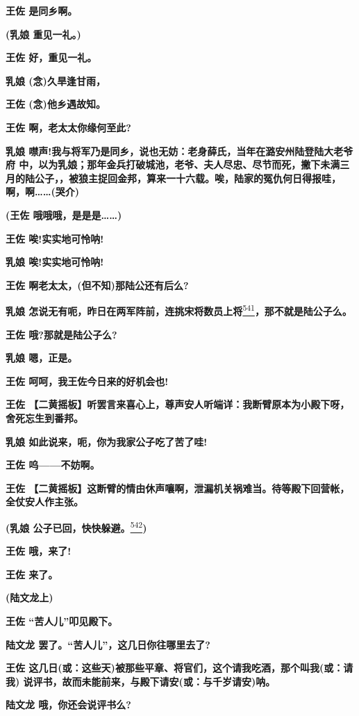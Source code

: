 \textbf{王佐 是同乡啊。}

\textbf{(乳娘 重见一礼。)}

\textbf{王佐 好，重见一礼。}

\textbf{乳娘 (念)久旱逢甘雨，}

\textbf{王佐 (念)他乡遇故知。}

\textbf{王佐 啊，老太太你缘何至此?}

\textbf{乳娘
噤声!我与将军乃是同乡，说也无妨：老身薛氏，当年在潞安州陆登陆大老爷府
中，以为乳娘；那年金兵打破城池，老爷、夫人尽忠、尽节而死，撇下未满三
月的陆公子，，被狼主捉回金邦，算来一十六载。唉，陆家的冤仇何日得报哇，
啊，啊\ldots{}\ldots{}(哭介)}

\textbf{(王佐 哦哦哦，是是是\ldots{}\ldots{})}

\textbf{王佐 唉!实实地可怜呐!}

\textbf{乳娘 唉!实实地可怜呐!}

\textbf{王佐 啊老太太，(但不知)那陆公还有后么?}

\textbf{乳娘
怎说无有呃，昨日在两军阵前，连挑宋将数员上将}\protect\hyperlink{fn541}{\textsuperscript{541}}\textbf{，那不就是陆公子么。}

\textbf{王佐 哦?那就是陆公子么?}

\textbf{乳娘 嗯，正是。}

\textbf{王佐 呵呵，我王佐今日来的好机会也!}

\textbf{王佐
【二黄摇板】听罢言来喜心上，尊声安人听端详：我断臂原本为小殿下呀，舍死忘生到番邦。}

\textbf{乳娘 如此说来，呃，你为我家公子吃了苦了哇!}

\textbf{王佐 呜------不妨啊。}

\textbf{王佐
【二黄摇板】这断臂的情由休声嚷啊，泄漏机关祸难当。待等殿下回营帐，全仗安人作主张。}

\textbf{(乳娘
公子已回，快快躲避。}\protect\hyperlink{fn542}{\textsuperscript{542}}\textbf{)}

\textbf{王佐 哦，来了!}

\textbf{王佐 来了。}

\textbf{(陆文龙上)}

\textbf{王佐 ``苦人儿''叩见殿下。}

\textbf{陆文龙 罢了。``苦人儿''，这几日你往哪里去了?}

\textbf{王佐
这几日(或：这些天)被那些平章、将官们，这个请我吃酒，那个叫我(或：请我)
说评书，故而未能前来，与殿下请安(或：与千岁请安)呐。}

\textbf{陆文龙 哦，你还会说评书么?}

